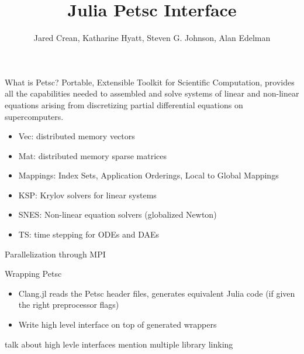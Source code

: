 \documentclass{beamer}
\title{Julia Petsc Interface}
\author[]{Jared Crean, Katharine Hyatt, Steven G. Johnson, Alan Edelman}
\begin{document}
\begin{frame}
\titlepage
\end{frame}

\begin{frame}{What is Petsc?}
Portable, Extensible Toolkit for Scientific Computation, provides all the 
capabilities needed to assembled and solve systems of linear and non-linear 
equations
arising from discretizing partial differential equations on supercomputers.
\begin{itemize}
  \item Vec: distributed memory vectors 
  \item Mat: distributed memory sparse matrices
  \item Mappings: Index Sets, Application Orderings, Local to Global Mappings
  \item KSP: Krylov solvers for linear systems
  \item SNES: Non-linear equation solvers (globalized Newton)
  \item TS: time stepping for ODEs and DAEs
\end{itemize}
Parallelization through MPI
\end{frame}


\begin{frame}{Wrapping Petsc}

\begin{itemize}
  \item Clang.jl reads the Petsc header files, generates equivalent Julia code (if given the right preprocessor flags)
  \item Write high level interface on top of generated wrappers
\end{itemize}


talk about high levle interfaces
mention multiple library linking
\end{frame}

\begin{comment}
\begin{frame}[fragile]{The Rewriter}
For each Petsc object, introduce a Julia immutable type
\begin{itemize}
  \item Parameterize on datatype \texttt{T} to enable dispatch
\end{itemize}
\begin{verbatim}
  typealias Mat Ptr{_p_Mat} -> immutable Mat{T}
\end{verbatim}
\hfill

Also map C equivalent types to more general types:
\begin{verbatim} 
  Ptr{Float64} -> Union{DenseArray{Float64},
                        Ptr{Float64}, Ref{Float64}}
\end{verbatim}
\hfill

Implemented with a recursive descent search and replace on the \texttt{Expr}s 
generated by Clang.jl

\end{frame}
\end{comment}
\end{document}
